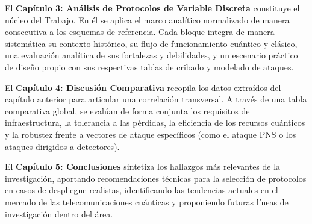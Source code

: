 El \textbf{Capítulo 3: Análisis de Protocolos de Variable Discreta} constituye el núcleo del Trabajo. En él se aplica el marco analítico normalizado de manera consecutiva a los esquemas de referencia. Cada bloque integra de manera sistemática su contexto histórico, su flujo de funcionamiento cuántico y clásico, una evaluación analítica de sus fortalezas y debilidades, y un escenario práctico de diseño propio con sus respectivas tablas de cribado y modelado de ataques.

El \textbf{Capítulo 4: Discusión Comparativa} recopila los datos extraídos del capítulo anterior para articular una correlación transversal. A través de una tabla comparativa global, se evalúan de forma conjunta los requisitos de infraestructura, la tolerancia a las pérdidas, la eficiencia de los recursos cuánticos y la robustez frente a vectores de ataque específicos (como el ataque PNS o los ataques dirigidos a detectores).

El \textbf{Capítulo 5: Conclusiones} sintetiza los hallazgos más relevantes de la investigación, aportando recomendaciones técnicas para la selección de protocolos en casos de despliegue realistas, identificando las tendencias actuales en el mercado de las telecomunicaciones cuánticas y proponiendo futuras líneas de investigación dentro del área.
